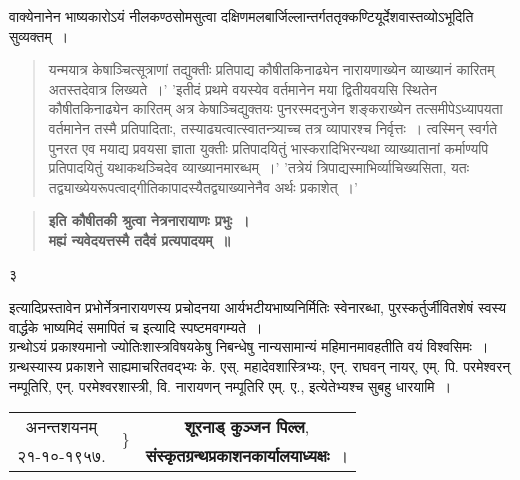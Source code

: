 \documentclass[11pt, openany]{book}
\begin{document}
\indent वाक्येनानेन भाष्यकारोऽयं नीलकण्ठसोमसुत्वा दक्षिणमलबार्जिल्लान्तर्गततृक्कण्टियूर्देशवास्तव्योऽभूदिति सुव्यक्तम्~। 

\begin{quote} 
	यन्मयात्र केषाञ्चित्सूत्राणां तद्युक्तीः प्रतिपाद्य कौषीतकिनाढ्येन नारायणाख्येन व्याख्यानं कारितम् अतस्तदेवात्र 
	लिख्यते~।' 'इतीदं प्रथमे वयस्येव वर्तमानेन मया द्वितीयवयसि स्थितेन कौषीतकिनाढ्येन कारितम् अत्र केषाञ्चिद्युक्तयः पुनरस्मदनुजेन शङ्कराख्येन तत्समीपेऽध्यापयता वर्तमानेन तस्मै प्रतिपादिताः, तस्याढ्यत्वात्स्वातन्त्र्याच्च तत्र व्यापारश्च निर्वृत्तः~। त्वस्मिन् स्वर्गते पुनरत एव मयाद्य प्रवयसा ज्ञाता युक्तीः प्रतिपादयितुं भास्करादिभिरन्यथा व्याख्यातानां कर्माण्यपि प्रतिपादयितुं यथाकथञ्चिदेव व्याख्यानमारब्धम्~।' 'तत्रेयं त्रिपाद्यस्माभिर्व्याचिख्यसिता, यतः तद्व्याख्येयरूपत्वाद्गीतिकापादस्यैतद्व्याख्यानेनैव अर्थः प्रकाशेत्~।'
\end{quote} 

\begin{quote}
\textbf{इति कौषीतकी श्रुत्वा नेत्रनारायाणः प्रभुः~। \\
मह्यं न्यवेदयत्तस्मै तदैवं प्रत्यपादयम्~॥} 
\end{quote}
\newpage
\thispagestyle{empty}
\begin{center} ३\\ \end{center}
\indent इत्यादिप्रस्तावेन प्रभोर्नेत्रनारायणस्य प्रचोदनया आर्यभटीयभाष्यनिर्मितिः स्वेनारब्धा, पुरस्कर्तुर्जीवितशेषं स्वस्य
वार्द्धके भाष्यमिदं समापितं च इत्यादि स्पष्टमवगम्यते~। \\

ग्रन्थोऽयं प्रकाश्यमानो ज्योतिःशास्त्रविषयकेषु निबन्धेषु नान्यसामान्यं महिमानमावहतीति वयं विश्वसिमः~। \\

ग्रन्थस्यास्य प्रकाशने साह्यमाचरितवद्भ्यः के. एस्. महादेवशास्त्रिभ्यः, एन्. राघवन् नायर्, एम्. पि. परमेश्वरन् 
नम्पूतिरि, एन्. परमेश्वरशास्त्री, वि. नारायणन् नम्पूतिरि एम्. ए., इत्येतेभ्यश्च सुबहु धारयामि~। 
\vspace{2cm} 
\begin{table}[h!]
    \centering
    \begin{tabular}{ccc}
     अनन्तशयनम्    &\multirow{2}{*}{$\Bigg\}$}& \textbf{शूरनाड् कुञ्जन पिल्ल}, \\
      २१-१०-१९५७.&   & \textbf{संस्कृतग्रन्थप्रकाशनकार्यालयाध्यक्षः}~।\\
    \end{tabular}
\end{table}
\end{document}
